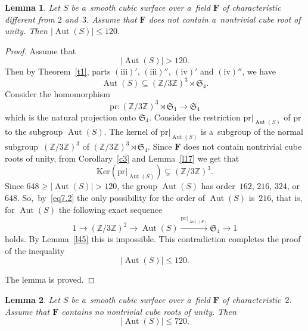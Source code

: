 \documentclass{amsart}
\numberwithin{equation}{section}
\theoremstyle{plain}
\newtheorem{lemma}{Lemma}
\theoremstyle{definition}
\theoremstyle{remark}
\begin{document}
\begin{lemma}
\label{l46}
Let $S$ be a~smooth cubic surface over a~field $\mathbf{F}$ of characteristic different from $2$ and~$3$. Assume that $\mathbf{F}$ does not contain a~nontrivial cube root of unity. Then $|{\operatorname{Aut}(S)}| \leqslant 120$.
\end{lemma}

\begin{proof}
Assume that
$$
|{\operatorname{Aut}(S)}| > 120.
$$
Then by Theorem~\ref{t1}, parts $(\mathrm{iii})'$, $(\mathrm{iii})''$, $(\mathrm{iv})'$ and $(\mathrm{iv})''$, we have
$$
\operatorname{Aut}(S) \subseteq (\mathbb{Z}/3\mathbb{Z})^3 \rtimes \mathfrak{S}_4.
$$
Consider the homomorphism
$$
\mathrm{pr} \colon (\mathbb{Z}/3\mathbb{Z})^3 \rtimes \mathfrak{S}_4 \to \mathfrak{S}_4
$$
which is the natural projection onto $\mathfrak{S}_4$. Consider the restriction $\mathrm{pr} |_{\operatorname{Aut}(S)}$ of $\mathrm{pr}$ to the subgroup $\operatorname{Aut}(S)$. The kernel of $\mathrm{pr}|_{\operatorname{Aut}(S)}$ is a~subgroup of the normal subgroup~$(\mathbb{Z}/3\mathbb{Z})^3$ of $(\mathbb{Z}/3\mathbb{Z})^3 \rtimes \mathfrak{S}_4$. Since $\mathbf{F}$ does not contain nontrivial cube roots of unity, from Corollary~\ref{c3} and Lemma~\ref{l17} we get that
\begin{equation}
\label{eq7.2}
\mathrm{Ker}(\mathrm{pr} |_{\operatorname{Aut}(S)}) \subsetneq (\mathbb{Z}/3\mathbb{Z})^3.
\end{equation}
Since $648 \geqslant |{\operatorname{Aut}(S)}| > 120$, the group $\operatorname{Aut}(S)$ has order~$162$, $216$, $324$, or $648$. So,~by~\eqref{eq7.2} the only possibility for the order of $\operatorname{Aut}(S)$ is~$216$, that is, for $\operatorname{Aut}(S)$ the following exact sequence
$$
1 \to (\mathbb{Z}/3\mathbb{Z})^2 \to \operatorname{Aut}(S) \xrightarrow{\mathrm{pr}|_{\operatorname{Aut}(S)}} \mathfrak{S}_4 \to 1
$$
holds. By Lemma~\ref{l45} this is impossible. This contradiction completes the proof of the inequality
$$
|{\operatorname{Aut}(S)}| \leqslant 120.
$$

The lemma is proved.
\end{proof}

\begin{lemma}
\label{l47}
Let $S$ be a~smooth cubic surface over a~field $\mathbf{F}$ of characteristic~$2$. Assume that $\mathbf{F}$ contains no nontrivial cube roots of unity. Then
$$
|{\operatorname{Aut}(S)}| \leqslant 720.
$$
\end{lemma}
\end{document}
